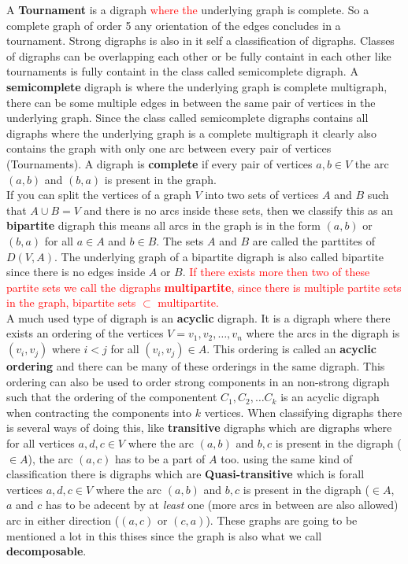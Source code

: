 A \textbf{Tournament} is a digraph \textcolor{red}{where the} underlying graph is complete. 
So a complete graph of order 5 any orientation of the edges concludes in a tournament.
Strong digraphs is also in it self a classification of digraphs. Classes of digraphs can be overlapping each other or be fully containt in each other like tournaments is fully containt in the class called semicomplete digraph.
A \textbf{semicomplete} digraph is where the underlying graph is complete multigraph, there can be some multiple edges in between the same pair of vertices in the underlying graph. Since the class called semicomplete digraphs contains all digraphs where the underlying graph is a complete multigraph it clearly also contains the graph with only one arc between every pair of vertices (Tournaments).
A digraph is \textbf{complete} if every pair of vertices $a,b\in V$ the arc $(a,b)$ and $(b,a)$ is present in the graph. \\
If you can split the vertices of a graph $V$ into two sets of vertices $A$ and $B$ such that $A\cup B=V$ and there is no arcs inside these sets, then we classify this as an \textbf{bipartite} digraph this means all arcs in the graph is in the form $(a,b)$ or $(b,a)$ for all $a\in A$ and $b\in B$. 
The sets $A$ and $B$ are called the parttites of $D(V,A)$. 
The underlying graph of a bipartite digraph is also called bipartite since there is no edges inside $A$ or $B$.
\textcolor{red}{ If there exists more then two of these partite sets we call the digraphs \textbf{multipartite}, since there is multiple partite sets in the graph, bipartite sets $\subset$ multipartite. }\\
A much used type of digraph is an \textbf{acyclic} digraph. 
It is a digraph where there exists an ordering of the vertices $V={v_1, v_2,\dots , v_n}$ where the arcs in the digraph is $(v_i, v_j)$ where $i<j$ for all $(v_i, v_j)\in A$. 
This ordering is called an \textbf{acyclic ordering} and there can be many of these orderings in the same digraph.
This ordering can also be used to order strong components in an non-strong digraph such that the ordering of the componentent $C_1,C_2,\dots C_k$ is an acyclic digraph when contracting the components into $k$ vertices. 
When classifying digraphs there is several ways of doing this, like \textbf{transitive} digraphs which are digraphs where for all vertices $a,d,c\in V$ where the arc $(a,b)$ and $b,c$ is present in the digraph ($\in A$), the arc $(a,c)$ has to be a part of $A$ too. 
using the same kind of classification there is digraphs which are \textbf{Quasi-transitive} which is forall vertices $a,d,c\in V$ where the arc $(a,b)$ and $b,c$ is present in the digraph ($\in A$, $a$ and $c$ has to be adecent by at \textit{least} one (more arcs in between are also allowed) arc in either direction ($(a,c)$ or $(c,a)$). These graphs are going to be mentioned a lot in this thises since the graph is also what we call \textbf{decomposable}.\\
